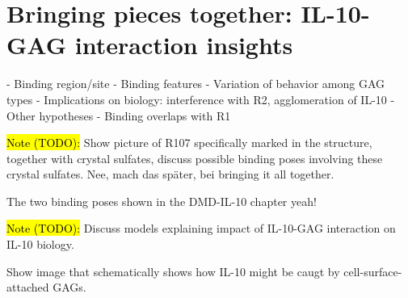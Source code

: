 \chapter{Bringing pieces together: IL-10-GAG interaction insights}

    - Binding region/site
    - Binding features
    - Variation of behavior among GAG types
    - Implications on biology: interference with R2, agglomeration of IL-10
    - Other hypotheses
        - Binding overlaps with R1


\hl{Note (TODO):}
Show picture of R107 specifically marked in the structure, together with
crystal sulfates, discuss possible binding poses involving these crystal
sulfates. Nee, mach das später, bei bringing it all together.

The two binding poses shown in the DMD-IL-10 chapter yeah!


\hl{Note (TODO):}
Discuss models explaining impact of IL-10-GAG interaction on IL-10 biology.

Show image that schematically shows how IL-10 might be caugt by cell-surface-attached GAGs.

